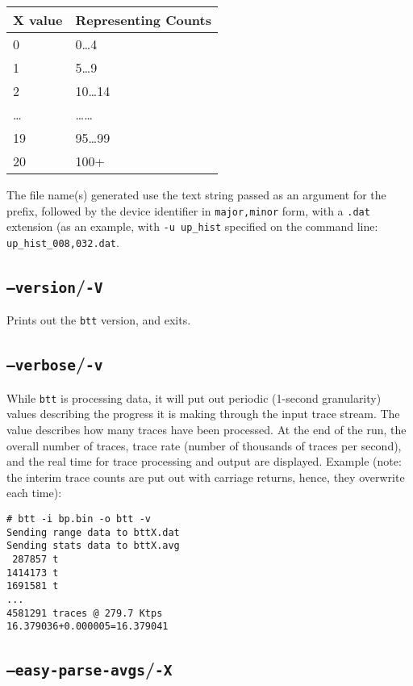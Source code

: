 \documentclass{article}
\begin{document}
  \medskip
  \begin{tabular}{ll}
\textbf{X value} & \textbf{Representing Counts} \\\hline
0 & 0\dots\/4 \\
1 & 5\dots\/9 \\
2 & 10\dots\/14 \\
\dots & \dots\dots\\
19 & 95\dots\/99 \\
20 & 100+ \\
  \end{tabular}

  \medskip
  The file name(s) generated use the text string passed as an argument for
  the prefix, followed by the device identifier in \texttt{major,minor}
  form, with a \texttt{.dat} extension (as an example, with \texttt{-u
  up\_hist} specified on the command line: \texttt{up\_hist\_008,032.dat}.

\subsection{\label{sec:o-V}\texttt{--version}/\texttt{-V}}

  Prints out the \texttt{btt} version, and exits.

\subsection{\label{sec:o-v}\texttt{--verbose}/\texttt{-v}}

  While \texttt{btt} is processing data, it will put out periodic (1-second
  granularity) values describing the progress it is making through the
  input trace stream. The value describes how many traces have been
  processed. At the end of the run, the overall number of traces, trace
  rate (number of thousands of traces per second), and the real time for
  trace processing and output are displayed. Example (note: the interim
  trace counts are put out with carriage returns, hence, they overwrite
  each time):

\begin{verbatim}
# btt -i bp.bin -o btt -v
Sending range data to bttX.dat
Sending stats data to bttX.avg
 287857 t
1414173 t
1691581 t
...
4581291 traces @ 279.7 Ktps
16.379036+0.000005=16.379041
\end{verbatim}

\subsection{\label{sec:o-X}\texttt{--easy-parse-avgs}/\texttt{-X}}
\end{document}
